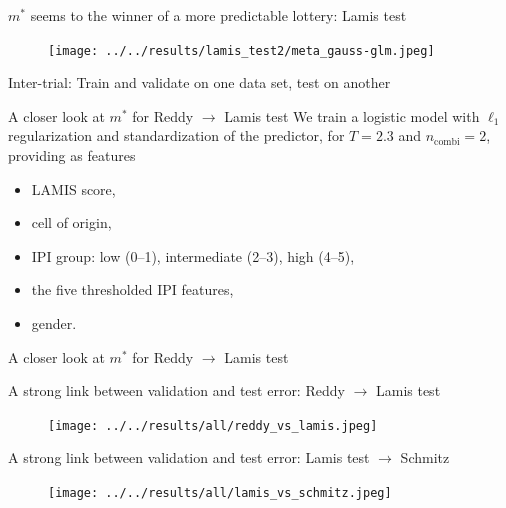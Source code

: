 \documentclass[10pt, aspectratio=169]{beamer}
\begin{document}
\begin{frame}{$m^*$ seems to the winner of a more predictable lottery: Lamis test}
  \begin{figure}[h]
    \centering
    \texttt{[image: ../../results/lamis\_test2/meta\_gauss-glm.jpeg]}
  \end{figure}
\end{frame}

\begin{frame}{Inter-trial: Train and validate on one data set, test on another}
  
\end{frame}

\begin{frame}{A closer look at $m^*$ for Reddy $\to$ Lamis test}
  We train a logistic model with $\ell_1$ regularization and standardization of 
  the predictor, for $T = \num{2.3}$ and 
  $n_\text{combi} = 2$, providing as features
  \begin{itemize}
    \item LAMIS score,
    \item cell of origin,
    \item IPI group: low (0--1), intermediate (2--3), high (4--5),
    \item the five thresholded IPI features,
    \item gender.
  \end{itemize}
\end{frame}

\begin{frame}{A closer look at $m^*$ for Reddy $\to$ Lamis test}
  
\end{frame}

\begin{frame}{A strong link between validation and test error: Reddy $\to$ Lamis test}
  \begin{figure}[h]
    \centering
    \texttt{[image: ../../results/all/reddy\_vs\_lamis.jpeg]}
  \end{figure}
\end{frame}

\begin{frame}{A strong link between validation and test error: Lamis test $\to$ Schmitz}
  \begin{figure}[h]
    \centering
    \texttt{[image: ../../results/all/lamis\_vs\_schmitz.jpeg]}
  \end{figure}
\end{frame}
\end{document}
